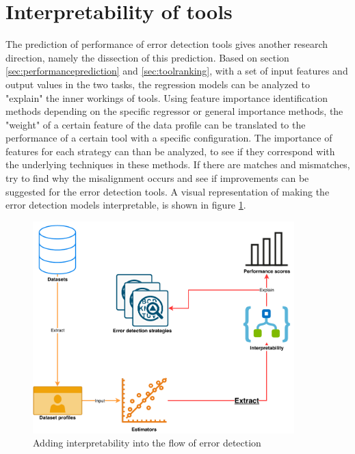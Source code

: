 \section{Interpretability of tools}
\label{sec:interpretabilityoftools}
The prediction of performance of error detection tools gives another research direction, namely the dissection of this prediction.
Based on section \ref{sec:performanceprediction} and \ref{sec:toolranking}, with a set of input features and output values in the two tasks, the regression models can be analyzed to "explain" the inner workings of tools. Using feature importance identification methods depending on the specific regressor or general importance methods, the "weight" of a certain feature of the data profile can be translated to the performance of a certain tool with a specific configuration. The importance of features for each strategy can than be analyzed, to see if they correspond with the underlying techniques in these methods. If there are matches and mismatches, try to find why the misalignment occurs and see if improvements can be suggested for the error detection tools. A visual representation of making the error detection models interpretable, is shown in figure \ref{fig:method_interpret}.

\begin{figure}
    \centering
    \includegraphics[width=0.9\textwidth]{thesis/Figures/Method/PerformanceEstimation-Interpretability.pdf}
    \caption{Adding interpretability into the flow of error detection}
    \label{fig:method_interpret}
\end{figure}

